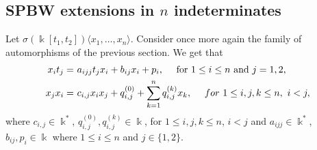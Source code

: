 \documentclass{amsart}
\theoremstyle{definition}
\theoremstyle{remark}
\numberwithin{equation}{section}
\begin{document}
\subsection{SPBW extensions in \texorpdfstring{$n$}{Lg} indeterminates}\label{SPBWTMTwoIn}

Let $\sigma(\Bbbk[t_1, t_2]) \langle x_1, \ldots, x_n\rangle$. Consider once more again the family of automorphisms of the previous section. We get that
\begin{align}
    x_it_j = &\  a_{ijj}t_jx_i+b_{ij}x_i+ p_i, \quad \text{ for } 1\leq i \leq n \text{ and } j=1, 2, \notag \\
    x_j x_i = &\ c_{i, j}x_i x_j + q_{i,j}^{(0)} + \sum_{k=1}^{n}q_{i,j}^{(k)}x_k, \quad\ {\rm for}\ 1\leq i, j, k \leq n,\ i<j, \label{DSdosnSPBW1}
\end{align}
where $c_{i,j}\in\Bbbk^{\ast}$, $q_{i,j}^{(0)}, q_{i,j}^{(k)}\in \Bbbk$,  for $1\leq i, j, k \leq n$, $i<j$ and $ a_{ijj}\in\Bbbk^{\ast}$, $b_{ij}, p_i \in\Bbbk$ where $1\leq i \leq n$ and $j\in \{1,2 \}$.
\end{document}
